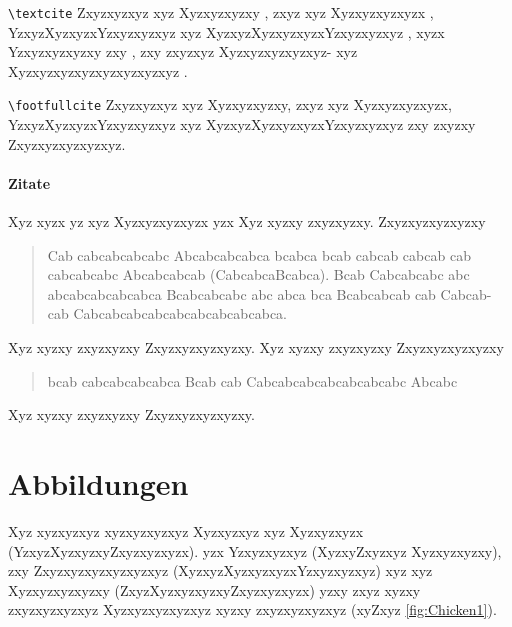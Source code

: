 \verb|\textcite| Zxyzxyzxyz xyz Xyzxyzxyzxy \textcite{shao+:1994:unrolling-lists}, zxyz xyz Xyzxyzxyzxyzx \textcite[22-25]{shao+:1994:unrolling-lists}, YzxyzXyzxyzxYzxyzxyzxyz xyz XyzxyzXyzxyzxyzxYzxyzxyzxyz \textcite[S.~42~ff.]{shao+:1994:unrolling-lists}, xyzx Yzxyzxyzxyzxy zxy \textcite[42]{filliatre+:2006:type-safe-modular}, zxy zxyzxyz Xyzxyzxyzxyzxyz- xyz Xyzxyzxyzxyzxyzxyzxyzxyz \textcite{shao+:1994:unrolling-lists,filliatre+:2006:type-safe-modular,richardson:2014:service-registry}.

\verb|\footfullcite| Zxyzxyzxyz xyz Xyzxyzxyzxy, zxyz xyz Xyzxyzxyzxyzx, YzxyzXyzxyzxYzxyzxyzxyz xyz XyzxyzXyzxyzxyzxYzxyzxyzxyz zxy zxyzxy Zxyzxyzxyzxyzxyz.


\paragraph{Zitate}
Xyz xyzx yz xyz Xyzxyzxyzxyzx yzx  Xyz xyzxy zxyzxyzxy. Zxyzxyzxyzxyzxy \blockquote[{\cite{shao+:1994:unrolling-lists}}]{Cab cabcabcabcabc Abcabcabcabca bcabca bcab cabcab cabcab cab cabcabcabc Abcabcabcab (CabcabcaBcabca). Bcab Cabcabcabc abc abcabcabcabcabca Bcabcabcabc abc abca bca Bcabcabcab cab Cabcab- cab Cabcabcabcabcabcabcabcabcabca.} Xyz xyzxy zxyzxyzxy Zxyzxyzxyzxyzxy. Xyz xyzxy zxyzxyzxy Zxyzxyzxyzxyzxy \blockquote[{\cite{shao+:1994:unrolling-lists}}]{bcab cabcabcabcabca Bcab cab Cabcabcabcabcabcabcabc Abcabc} Xyz xyzxy zxyzxyzxy Zxyzxyzxyzxyzxy.


\section{Abbildungen}
Xyz xyzxyzxyz xyzxyzxyzxyz Xyzxyzxyz xyz Xyzxyzxyzx (YzxyzXyzxyzxyZxyzxyzxyzx). yzx Yzxyzxyzxyz (XyzxyZxyzxyz Xyzxyzxyzxy), zxy Zxyzxyzxyzxyzxyzxyz (XyzxyzXyzxyzxyzxYzxyzxyzxyz) xyz xyz Xyzxyzxyzxyzxy (ZxyzXyzxyzxyzxyZxyzxyzxyzx) yzxy zxyz xyzxy zxyzxyzxyzxyz Xyzxyzxyzxyzxyz xyzxy zxyzxyzxyzxyz (xyZxyz \autoref{fig:Chicken1}).

